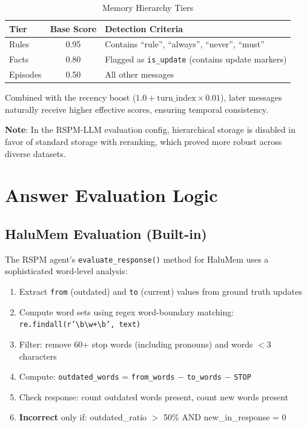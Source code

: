 \documentclass[11pt,a4paper]{article}
\begin{document}
\begin{table}[H]
\centering
\caption{Memory Hierarchy Tiers}
\begin{tabular}{@{}lcl@{}}
\toprule
\textbf{Tier} & \textbf{Base Score} & \textbf{Detection Criteria} \\
\midrule
Rules     & 0.95 & Contains ``rule'', ``always'', ``never'', ``must'' \\
Facts     & 0.80 & Flagged as \texttt{is\_update} (contains update markers) \\
Episodes  & 0.50 & All other messages \\
\bottomrule
\end{tabular}
\end{table}

Combined with the recency boost ($1.0 + \text{turn\_index} \times 0.01$), later messages naturally receive higher effective scores, ensuring temporal consistency.

\textbf{Note}: In the RSPM-LLM evaluation config, hierarchical storage is disabled in favor of standard storage with reranking, which proved more robust across diverse datasets.

\section{Answer Evaluation Logic}

\subsection{HaluMem Evaluation (Built-in)}

The RSPM agent's \texttt{evaluate\_response()} method for HaluMem uses a sophisticated word-level analysis:

\begin{enumerate}
    \item Extract \texttt{from} (outdated) and \texttt{to} (current) values from ground truth updates
    \item Compute word sets using regex word-boundary matching: \texttt{re.findall(r'\textbackslash b\textbackslash w+\textbackslash b', text)}
    \item Filter: remove 60+ stop words (including pronouns) and words $<$3 characters
    \item Compute: \texttt{outdated\_words} = \texttt{from\_words} $-$ \texttt{to\_words} $-$ \texttt{STOP}
    \item Check response: count outdated words present, count new words present
    \item \textbf{Incorrect} only if: outdated\_ratio $>$ 50\% AND new\_in\_response = 0
\end{enumerate}
\end{document}
